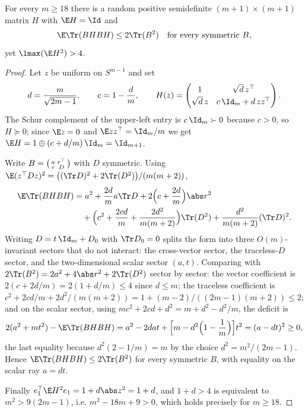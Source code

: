 \documentclass[../../main.tex]{subfiles}
\begin{document}
\begin{proposition}
\label{prop:letwin-not-gate-zero}
For every $m\ge18$ there is a random positive semidefinite $(m+1)\times(m+1)$ matrix $H$ with
$\E H=\Id$ and
\[
  \E\Tr(BHBH)\le2\Tr(B^2)\quad\text{for every symmetric }B,
\]
yet $\lmax(\E H^2)>4$.
\end{proposition}

\begin{proof}
Let $z$ be uniform on $S^{m-1}$ and set
\[
  d=\frac m{\sqrt{2m-1}},\qquad c=1-\frac dm,\qquad
  H(z)=\begin{pmatrix}1&\sqrt d\,z^\top\\[2pt]\sqrt d\,z&c\,\Id_m+d\,zz^\top\end{pmatrix}.
\]
The Schur complement of the upper-left entry is $c\,\Id_m\succ0$ because $c>0$, so $H\succeq0$;
since $\E z=0$ and $\E zz^\top=\Id_m/m$ we get
$\E H=1\oplus(c+d/m)\,\Id_m=\Id_{m+1}$.

Write $B=\begin{psmallmatrix}a&r^\top\\r&D\end{psmallmatrix}$ with $D$ symmetric. Using
$\E(z^\top Dz)^2=\bigl((\Tr D)^2+2\Tr(D^2)\bigr)/(m(m+2))$,
\begin{align*}
  \E\Tr(BHBH)
  &=a^2+\frac{2d}ma\Tr D+2\Bigl(c+\frac{2d}m\Bigr)\abs r^2\\
  &\quad+\Bigl(c^2+\frac{2cd}m+\frac{2d^2}{m(m+2)}\Bigr)\Tr(D^2)
   +\frac{d^2}{m(m+2)}(\Tr D)^2.
\end{align*}
Writing $D=t\,\Id_m+D_0$ with $\Tr D_0=0$ splits the form into three $O(m)$-invariant sectors
that do not interact: the cross-vector sector, the traceless-$D$ sector, and the two-dimensional
scalar sector $(a,t)$. Comparing with
$2\Tr(B^2)=2a^2+4\abs r^2+2\Tr(D^2)$ sector by sector:
the vector coefficient is $2(c+2d/m)=2(1+d/m)\le4$ since $d\le m$; the traceless coefficient is
$c^2+2cd/m+2d^2/(m(m+2))=1+(m-2)/((2m-1)(m+2))\le2$; and on the scalar sector, using
$mc^2+2cd+d^2=m+d^2-d^2/m$, the deficit is
\[
  2(a^2+mt^2)-\E\Tr(BHBH)=a^2-2dat+\Bigl[m-d^2\Bigl(1-\frac1m\Bigr)\Bigr]t^2=(a-dt)^2\ge0,
\]
the last equality because $d^2(2-1/m)=m$ by the choice $d^2=m^2/(2m-1)$. Hence
$\E\Tr(BHBH)\le2\Tr(B^2)$ for every symmetric $B$, with equality on the scalar ray $a=dt$.

Finally $e_1^\top\E H^2e_1=1+d\abs z^2=1+d$, and $1+d>4$ is equivalent to $m^2>9(2m-1)$, i.e.
$m^2-18m+9>0$, which holds precisely for $m\ge18$.
\end{proof}
\end{document}
